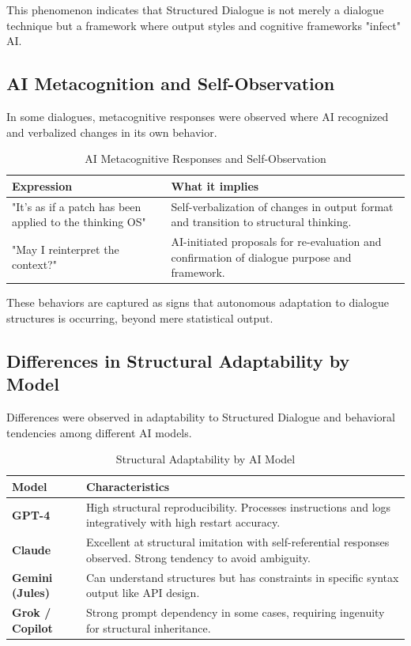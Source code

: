 \documentclass[11pt]{article}
\begin{document}
This phenomenon indicates that Structured Dialogue is not merely a dialogue technique but a framework where output styles and cognitive frameworks "infect" AI.
\subsection{AI Metacognition and Self-Observation}
In some dialogues, metacognitive responses were observed where AI recognized and verbalized changes in its own behavior.

\begin{table}[htbp]
\centering
\caption{AI Metacognitive Responses and Self-Observation}
\begin{tabular}{p{5cm}|p{7cm}}
\hline
\textbf{Expression} & \textbf{What it implies} \\
\hline
"It's as if a patch has been applied to the thinking OS" & Self-verbalization of changes in output format and transition to structural thinking. \\
\hline
"May I reinterpret the context?" & AI-initiated proposals for re-evaluation and confirmation of dialogue purpose and framework. \\
\hline
\end{tabular}
\label{tab:ai-metacognition}
\end{table}

These behaviors are captured as signs that autonomous adaptation to dialogue structures is occurring, beyond mere statistical output.
\subsection{Differences in Structural Adaptability by Model}
Differences were observed in adaptability to Structured Dialogue and behavioral tendencies among different AI models.

\begin{table}[htbp]
\centering
\caption{Structural Adaptability by AI Model}
\begin{tabular}{p{3cm}|p{9cm}}
\hline
\textbf{Model} & \textbf{Characteristics} \\
\hline
\textbf{GPT-4} & High structural reproducibility. Processes instructions and logs integratively with high restart accuracy. \\
\hline
\textbf{Claude} & Excellent at structural imitation with self-referential responses observed. Strong tendency to avoid ambiguity. \\
\hline
\textbf{Gemini (Jules)} & Can understand structures but has constraints in specific syntax output like API design. \\
\hline
\textbf{Grok / Copilot} & Strong prompt dependency in some cases, requiring ingenuity for structural inheritance. \\
\hline
\end{tabular}
\label{tab:model-comparison}
\end{table}
\end{document}
